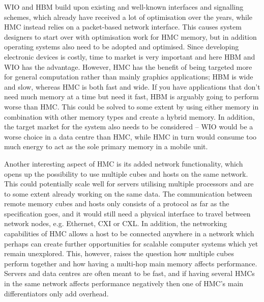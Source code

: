 WIO and HBM build upon existing and well-known interfaces and signalling schemes, which already have received a lot of optimisation over the years, while HMC instead relies on a packet-based network interface. This causes system designers to start over with optimisation work for HMC memory, but in addition operating systems also need to be adopted and optimised. Since developing electronic devices is costly, time to market is very important and here HBM and WIO has the advantage. However, HMC has the benefit of being targeted more for general computation rather than mainly graphics applications; HBM is wide and slow, whereas HMC is both fast and wide. If you have applications that don't need much memory at a time but need it fast, HBM is arguably going to perform worse than HMC. This could be solved to some extent by using either memory in combination with other memory types and create a hybrid memory. In addition, the target market for the system also needs to be considered -- WIO would be a worse choice in a data centre than HMC, while HMC in turn would consume too much energy to act as the sole primary memory in a mobile unit.
\bigskip

Another interesting aspect of HMC is its added network functionality, which opens up the possibility to use multiple cubes and hosts on the same network. This could potentially scale well for servers utilising multiple processors and are to some extent already working on the same data. The communication between remote memory cubes and hosts only consists of a protocol as far as the specification goes, and it would still need a physical interface to travel between network nodes, e.g. Ethernet, CXI or CXL. In addition, the networking capabilities of HMC allows a host to be connected anywhere in a network which perhaps can create further opportunities for scalable computer systems which yet remain unexplored. This, however, raises the question how multiple cubes perform together and how having a multi-hop main memory affects performance. Servers and data centres are often meant to be fast, and if having several HMCs in the same network affects performance negatively then one of HMC's main differentiators only add overhead.
\bigskip

